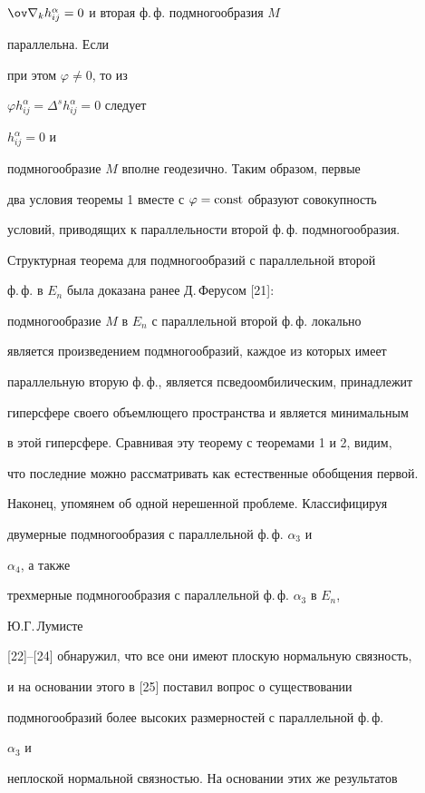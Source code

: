 $\ov\nabla_k h^\alpha_{ij}=0$ и вторая ф.\,ф. подмногообразия $M$


параллельна. Если


при этом $\varphi\ne 0$, то из


$\varphi h^\alpha_{ij}=\Delta^s h^\alpha_{ij}=0$ следует


$h^\alpha_{ij}=0$ и


подмногообразие $M$ вполне геодезично. Таким образом, первые


два условия теоремы 1 вместе с $\varphi=\operatorname{const}$ образуют совокупность


условий, приводящих к параллельности второй ф.\,ф. подмногообразия.





Структурная теорема для подмногообразий с параллельной второй


ф.\,ф. в $E_n$ была доказана ранее Д.\,Ферусом [21]:


подмногообразие $M$ в $E_n$ с параллельной второй ф.\,ф. локально


является произведением подмногообразий, каждое из которых имеет


параллельную вторую ф.\,ф., является псведоомбилическим, принадлежит


гиперсфере своего объемлющего пространства и является минимальным


в этой гиперсфере. Сравнивая эту теорему с теоремами 1 и 2, видим,


что последние можно рассматривать как естественные обобщения первой.





Наконец, упомянем об одной нерешенной проблеме. Классифицируя


двумерные подмногообразия с параллельной ф.\,ф. $\alpha_3$ и


$\alpha_4$, а также


трехмерные подмногообразия с параллельной ф.\,ф. $\alpha_3$ в $E_n$,


Ю.Г.\,Лумисте


[22]--[24] обнаружил, что все они имеют плоскую нормальную связность,


и на основании этого в [25] поставил вопрос о существовании


подмногообразий более высоких размерностей с параллельной ф.\,ф.


$\alpha_3$ и


неплоской нормальной связностью. На основании этих же результатов


